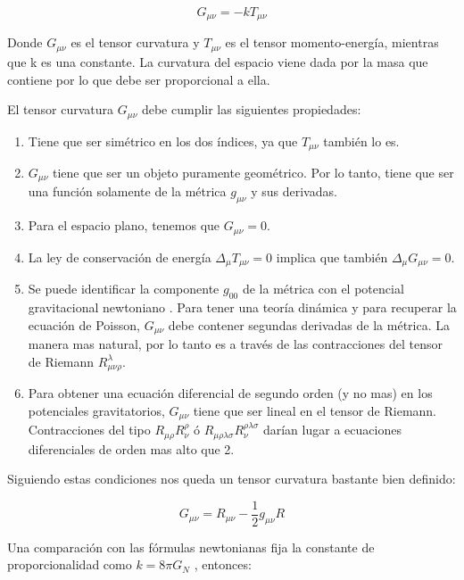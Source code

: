 \documentclass{article}
\begin{document}
\begin{equation}
    G_{\mu \nu}=-kT_{\mu \nu}
\end{equation}

Donde $G_{\mu \nu}$ es el tensor curvatura y $T_{\mu \nu}$ es el tensor momento-energía, mientras que k es una constante. La curvatura del espacio viene dada por la masa que contiene por lo que debe ser proporcional a ella.

El tensor curvatura $G_{\mu\nu}$ debe cumplir las siguientes propiedades\cite{janssen2013teoria}:

\begin{enumerate}
    \item Tiene que ser simétrico en los dos índices, ya que $T_{\mu\nu}$ también lo es.
    \item $G_{\mu\nu}$ tiene que ser un objeto puramente geométrico. Por lo tanto, tiene que ser una función
    solamente de la métrica $g_{\mu\nu}$ y sus derivadas.
    \item Para el espacio plano, tenemos que $G_{\mu\nu} = 0$.
    \item La ley de conservación de energía $\Delta_{\mu}T_{\mu\nu}= 0$ implica que también $\Delta_{\mu}G_{\mu\nu}= 0$.
    \item Se puede identificar la componente $g_{00}$ de la métrica con el potencial gravitacional newtoniano . Para tener una teoría dinámica y para recuperar la ecuación de Poisson, $G_{\mu\nu}$ debe contener segundas derivadas de la métrica. La manera mas
    natural, por lo tanto es a través de las contracciones del tensor de Riemann $R_{\mu\nu\rho}^{\lambda}$.
    \item Para obtener una ecuación diferencial de segundo orden (y no mas) en los potenciales gravitatorios, $G_{\mu\nu}$ tiene que ser lineal en el tensor de Riemann. Contracciones del tipo $R_{\mu\rho}R_{\nu}^{\rho}$ ó $R_{\mu\rho\lambda\sigma}R_{\nu}^{\rho\lambda\sigma}$ darían lugar a ecuaciones diferenciales de orden mas alto que 2.
\end{enumerate}

Siguiendo estas condiciones nos queda un tensor curvatura bastante bien definido:

\begin{equation}
    G_{\mu \nu}=R_{\mu \nu}-\frac{1}{2}g_{\mu \nu}R
\end{equation}

Una comparación con las fórmulas newtonianas fija la constante de proporcionalidad como $k=8\pi G_{N}$ \cite{janssen2013teoria}, entonces:
\end{document}
